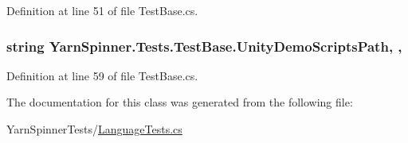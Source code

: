 Definition at line 51 of file Test\-Base.\-cs.

\hypertarget{a00172_a39922286f6255e4fd0e433a4fc7521c4}{
\subsubsection[{Unity\-Demo\-Scripts\-Path}]{\setlength{\rightskip}{0pt plus 5cm}string Yarn\-Spinner.\-Tests.\-Test\-Base.\-Unity\-Demo\-Scripts\-Path\hspace{0.3cm}{\ttfamily [static]}, {\ttfamily [get]}, {\ttfamily [inherited]}}}\label{a00172_a39922286f6255e4fd0e433a4fc7521c4}


Definition at line 59 of file Test\-Base.\-cs.



The documentation for this class was generated from the following file\-:\begin{DoxyCompactItemize}
\item 
Yarn\-Spinner\-Tests/\hyperlink{a00332}{Language\-Tests.\-cs}\end{DoxyCompactItemize}
